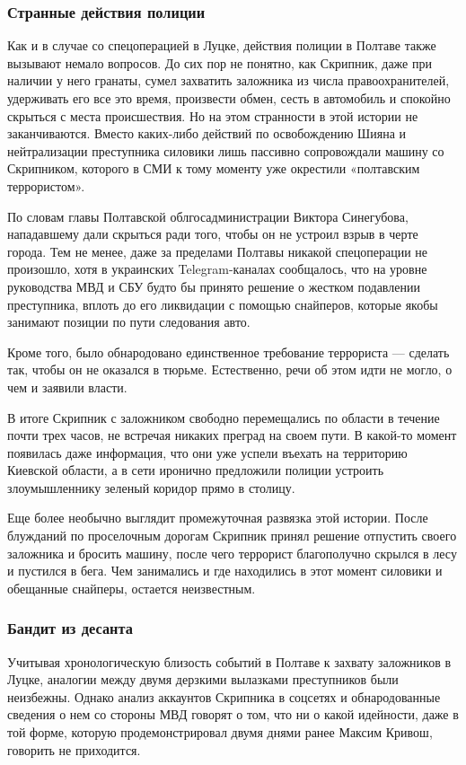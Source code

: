 \subsubsection{Странные действия полиции}

Как и в случае со спецоперацией в Луцке, действия полиции в Полтаве также
вызывают немало вопросов. До сих пор не понятно, как Скрипник, даже при наличии
у него гранаты, сумел захватить заложника из числа правоохранителей, удерживать
его все это время, произвести обмен, сесть в автомобиль и спокойно скрыться с
места происшествия.  Но на этом странности в этой истории не заканчиваются.
Вместо каких-либо действий по освобождению Шияна и нейтрализации преступника
силовики лишь пассивно сопровождали машину со Скрипником, которого в СМИ к тому
моменту уже окрестили «полтавским террористом».

По словам главы Полтавской облгосадминистрации Виктора Синегубова, нападавшему
дали скрыться ради того, чтобы он не устроил взрыв в черте города. Тем не
менее, даже за пределами Полтавы никакой спецоперации не произошло, хотя в
украинских Telegram-каналах сообщалось, что на уровне руководства МВД и СБУ
будто бы принято решение о жестком подавлении преступника, вплоть до его
ликвидации с помощью снайперов, которые якобы занимают позиции по пути
следования авто.

Кроме того, было обнародовано единственное требование террориста — сделать так,
чтобы он не оказался в тюрьме. Естественно, речи об этом идти не могло, о чем и
заявили власти.

В итоге Скрипник с заложником свободно перемещались по области в течение почти
трех часов, не встречая никаких преград на своем пути. В какой-то момент
появилась даже информация, что они уже успели въехать на территорию Киевской
области, а в сети иронично предложили полиции устроить злоумышленнику зеленый
коридор прямо в столицу.

Еще более необычно выглядит промежуточная развязка этой истории. После
блужданий по проселочным дорогам Скрипник принял решение отпустить своего
заложника и бросить машину, после чего террорист благополучно скрылся в лесу и
пустился в бега. Чем занимались и где находились в этот момент силовики и
обещанные снайперы, остается неизвестным. 

\subsubsection{Бандит из десанта}

Учитывая хронологическую близость событий в Полтаве к захвату заложников в
Луцке, аналогии между двумя дерзкими вылазками преступников были неизбежны.
Однако анализ аккаунтов Скрипника в соцсетях и обнародованные сведения о нем со
стороны МВД говорят о том, что ни о какой идейности, даже в той форме, которую
продемонстрировал двумя днями ранее Максим Кривош, говорить не приходится.

